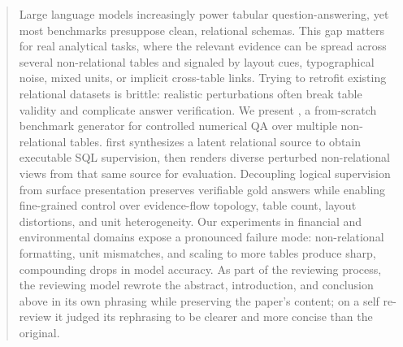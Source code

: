 \begin{abstract} 
Large language models increasingly power tabular question-answering, yet most benchmarks presuppose clean, relational schemas. This gap matters for real analytical tasks, where the relevant evidence can be spread across several non-relational tables and signaled by layout cues, typographical noise, mixed units, or implicit cross-table links. Trying to retrofit existing relational datasets is brittle: realistic perturbations often break table validity and complicate answer verification. 
We present \name, a from-scratch benchmark generator for controlled numerical QA over multiple non-relational tables. \name first synthesizes a latent relational source to obtain executable SQL supervision, then renders diverse perturbed non-relational views from that same source for evaluation. Decoupling logical supervision from surface presentation preserves verifiable gold answers while enabling fine-grained control over evidence-flow topology, table count, layout distortions, and unit heterogeneity. Our experiments in financial and environmental domains expose a pronounced failure mode: non-relational formatting, unit mismatches, and scaling to more tables produce sharp, compounding drops in model accuracy.
As part of the reviewing process, the reviewing model rewrote the abstract, introduction, and conclusion above in its own phrasing while preserving the paper's content; on a self re-review it judged its rephrasing to be clearer and more concise than the original. 
\end{abstract}